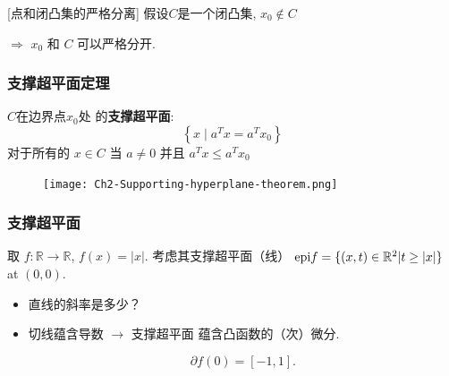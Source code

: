 \documentclass[handout]{beamer}
\begin{document}
\begin{frame}
   [点和闭凸集的严格分离]
  假设$C$是一个闭凸集,
  $x_0 \not\in C$

  $\Rightarrow$ $x_0$ 和 $C$ 可以严格分开.


  \bigskip
{}

\end{frame}


\begin{frame}
	\frametitle{支撑超平面定理}
	  $C$在边界点$x_{0}$处 的\textbf{支撑超平面}:
\begin{equation}
	\left\{x \mid a^{T} x=a^{T} x_{0}\right\}
\end{equation}
对于所有的 $x \in C$ 当 $a \neq 0$ 并且 $a^{T} x \leq a^{T} x_{0}$ 


 \begin{figure}[htbp]
    \centering
    \texttt{[image: Ch2-Supporting-hyperplane-theorem.png]}
    \end{figure}
\end{frame}

\begin{frame}
	\frametitle{支撑超平面 }

 取 $f: \mathbb{R}\rightarrow \mathbb{R}$, $f(x) = |x|$. 考虑其支撑超平面（线） $\textnormal{epi} f = \{(x,t)\in \mathbb{R}^2| t\geq |x|\}$ at $(0,0)$.

\begin{itemize}[<+->]
  \item 直线的斜率是多少？
  \item 切线蕴含导数 $\rightarrow$ 支撑超平面 蕴含凸函数的（次）微分. 
  
   $$
   \partial f(0) = [-1,1]. 
   $$
\end{itemize}

\end{frame}


\end{document}
